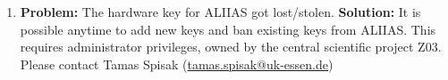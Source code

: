 \begin{enumerate}
     \item \label{faq:lostkey} \textbf{Problem:}
    The hardware key for ALIIAS got lost/stolen.
    \newline
    \textbf{Solution:}
    It is possible anytime to add new keys and ban existing keys from ALIIAS. This requires administrator privileges, owned by the central scientific project Z03. Please contact Tamas Spisak (\href{mailto:tamas.spisak@uk-essen.de}{\color{pniblue}tamas.spisak@uk-essen.de})
    
\end{enumerate}

